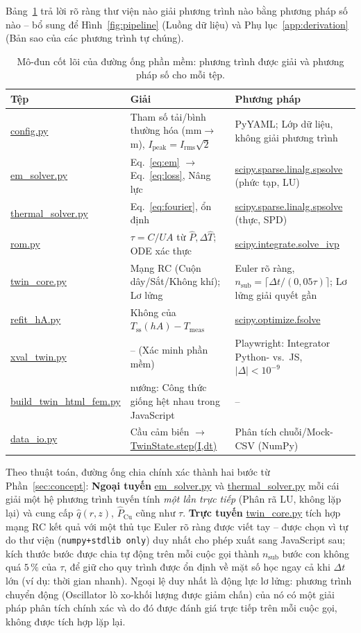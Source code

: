 \documentclass[a4paper, 10pt, conference]{ieeeconf}
\theoremstyle{remark}
\begin{document}
Bảng~\ref{tab:modules} trả lời rõ ràng thư viện nào giải phương trình nào bằng
phương pháp số nào -- bổ sung để Hình~\ref{fig:pipeline} (Luồng dữ liệu) và
Phụ lục~\ref{app:derivation} (Bản sao của các phương trình tự chúng).

\begin{table}[h]
\centering\scriptsize
\caption{Mô-đun cốt lõi của đường ống phần mềm: phương trình được giải và phương
pháp số cho mỗi tệp.}
\label{tab:modules}
\begin{tabularx}{\linewidth}{@{}p{1.6cm} X X@{}}
\toprule
Tệp & Giải & Phương pháp \\
\midrule
\url{config.py} & Tham số tải/bình thường hóa (mm$\to$m), $I_{\mathrm{peak}}=I_{\mathrm{rms}}\sqrt2$ & PyYAML; Lớp dữ liệu, không giải phương trình \\
\url{em_solver.py} & Eq.~\eqref{eq:em} $\to$ Eq.~\eqref{eq:loss}, Nâng lực & \url{scipy.sparse.linalg.spsolve} (phức tạp, LU) \\
\url{thermal_solver.py} & Eq.~\eqref{eq:fourier}, ổn định & \url{scipy.sparse.linalg.spsolve} (thực, SPD) \\
\url{rom.py} & $\tau{=}C/UA$ từ $\hat P,\Delta\hat T$; ODE xác thực & \url{scipy.integrate.solve_ivp} \\
\url{twin_core.py} & Mạng RC (Cuộn dây/Sắt/Không khí); Lơ lửng & Euler rõ ràng, $n_{\mathrm{sub}}{=}\lceil\Delta t/(0{,}05\tau)\rceil$; Lơ lửng giải quyết gần \\
\url{refit_hA.py} & Không của $T_{\mathrm{ss}}(hA)-T_{\mathrm{meas}}$ & \url{scipy.optimize.fsolve} \\
\url{xval_twin.py} & -- (Xác minh phần mềm) & Playwright: Integrator Python- vs.\ JS, $|\Delta|{<}10^{-9}$ \\
\url{build_twin_html_fem.py} & nướng: Công thức giống hệt nhau trong JavaScript & -- \\
\url{data_io.py} & Cầu cảm biến $\to$ \url{TwinState.step(I,dt)} & Phân tích chuỗi/Mock-CSV (NumPy) \\
\bottomrule
\end{tabularx}
\end{table}

Theo thuật toán, đường ống chia chính xác thành hai bước từ Phần~\ref{sec:concept}:
\textbf{Ngoại tuyến} \url{em_solver.py} và \url{thermal_solver.py} mỗi cái giải một
hệ phương trình tuyến tính \emph{một lần trực tiếp} (Phân rã LU, không lặp lại) và
cung cấp $\hat q(r,z)$, $\hat P_{\mathrm{Cu}}$ cũng như $\tau$. \textbf{Trực tuyến}
\url{twin_core.py} tích hợp mạng RC kết quả với một thủ tục Euler rõ ràng được viết
tay -- được chọn vì tự do thư viện (\texttt{numpy+stdlib only}) duy nhất cho phép
xuất sang JavaScript sau; kích thước bước được chia tự động trên mỗi cuộc gọi thành
$n_{\mathrm{sub}}$ bước con không quá $5\,\%$ của $\tau$, để giữ cho quy trình được
ổn định về mặt số học ngay cả khi $\Delta t$ lớn (ví dụ: thời gian nhanh). Ngoại lệ
duy nhất là động lực lơ lửng: phương trình chuyển động (Oscillator lò xo-khối lượng
được giảm chấn) của nó có một giải pháp phân tích chính xác và do đó được đánh giá
trực tiếp trên mỗi cuộc gọi, không được tích hợp lặp lại.
\end{document}

